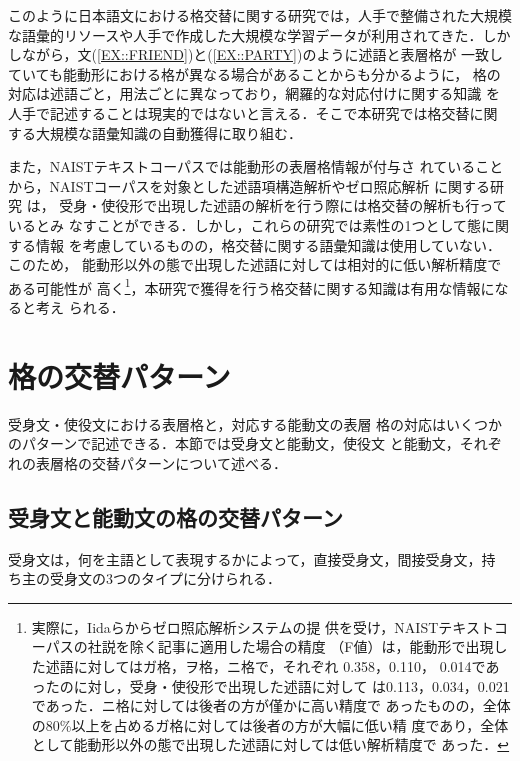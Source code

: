\documentclass[japanese]{jnlp_1.4}
\begin{document}
 このように日本語文における格交替に関する研究では，人手で整備された大規模
 な語彙的リソースや人手で作成した大規模な学習データが利用されてきた．しか
 しながら，文(\ref{EX::FRIEND})と(\ref{EX::PARTY})のように述語と表層格が
 一致していても能動形における格が異なる場合があることからも分かるように，
 格の対応は述語ごと，用法ごとに異なっており，網羅的な対応付けに関する知識
 を人手で記述することは現実的ではないと言える．そこで本研究では格交替に関
 する大規模な語彙知識の自動獲得に取り組む．

 また，NAISTテキストコーパス\cite{Iida2007}では能動形の表層格情報が付与さ
 れていることから，NAISTコーパスを対象とした述語項構造解析やゼロ照応解析
 に関する研究
 \cite{Taira2008s,Iida2009,Imamura2009s,Yoshikawa2010,Hayashibe2014}は，
 受身・使役形で出現した述語の解析を行う際には格交替の解析も行っているとみ
 なすことができる．しかし，これらの研究では素性の1つとして態に関する情報
 を考慮しているものの，格交替に関する語彙知識は使用していない．このため，
 能動形以外の態で出現した述語に対しては相対的に低い解析精度である可能性が
 高く\footnote{実際に，Iidaらからゼロ照応解析システム\cite{Iida2009}の提
 供を受け，NAISTテキストコーパスの社説を除く記事に適用した場合の精度
 （F値）は，\pagebreak 能動形で出現した述語に対してはガ格，ヲ格，ニ格で，それぞれ
 0.358，0.110， 0.014であったのに対し，受身・使役形で出現した述語に対して
 は0.113，0.034，0.021であった．ニ格に対しては後者の方が僅かに高い精度で
 あったものの，全体の80\%以上を占めるガ格に対しては後者の方が大幅に低い精
 度であり，全体として能動形以外の態で出現した述語に対しては低い解析精度で
 あった．}，本研究で獲得を行う格交替に関する知識は有用な情報になると考え
 られる．


 \section{格の交替パターン}
 \label{SEC::PATTERN}

受身文・使役文における表層格と，対応する能動文の表層
 格の対応はいくつかのパターンで記述できる．本節では受身文と能動文，使役文
 と能動文，それぞれの表層格の交替パターンについて述べる．


  \subsection{受身文と能動文の格の交替パターン}

  受身文は，何を主語として表現するかによって，直接受身文，間接受身文，持
  ち主の受身文の3つのタイプに分けられる\cite{GendaiNihongo4}．
\end{document}
